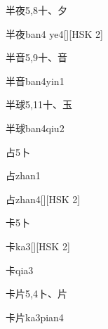 \begin{entry}{半夜}{5,8}{⼗、⼣}
  \begin{phonetics}{半夜}{ban4 ye4}[][HSK 2]
  \end{phonetics}
\end{entry}

\begin{entry}{半音}{5,9}{⼗、⾳}
  \begin{phonetics}{半音}{ban4yin1}
  \end{phonetics}
\end{entry}

\begin{entry}{半球}{5,11}{⼗、⽟}
  \begin{phonetics}{半球}{ban4qiu2}
  \end{phonetics}
\end{entry}

\begin{entry}{占}{5}{⼘}
  \begin{phonetics}{占}{zhan1}
  \end{phonetics}
  \begin{phonetics}{占}{zhan4}[][HSK 2]
  \end{phonetics}
\end{entry}

\begin{entry}{卡}{5}{⼘}
  \begin{phonetics}{卡}{ka3}[][HSK 2]
  \end{phonetics}
  \begin{phonetics}{卡}{qia3}
  \end{phonetics}
\end{entry}

\begin{entry}{卡片}{5,4}{⼘、⽚}
  \begin{phonetics}{卡片}{ka3pian4}
  \end{phonetics}
\end{entry}

